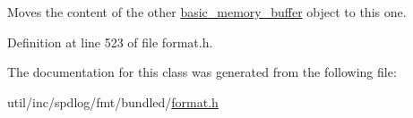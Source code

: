 Moves the content of the other {\ttfamily \hyperlink{classbasic__memory__buffer}{basic\+\_\+memory\+\_\+buffer}} object to this one.  

Definition at line 523 of file format.\+h.



The documentation for this class was generated from the following file\+:\begin{DoxyCompactItemize}
\item 
util/inc/spdlog/fmt/bundled/\hyperlink{format_8h}{format.\+h}\end{DoxyCompactItemize}
